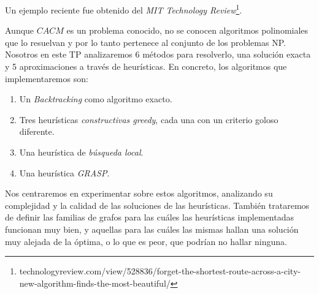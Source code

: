 Un ejemplo reciente fue obtenido del \textit{MIT Technology Review}\footnote{technologyreview.com/view/528836/forget-the-shortest-route-across-a-city-new-algorithm-finds-the-most-beautiful/}. 

Aunque $CACM$ es un problema conocido, no se conocen algoritmos polinomiales que lo resuelvan y por lo tanto pertenece al conjunto de los problemas NP. Nosotros en este TP analizaremos 6 m\'etodos para resolverlo, una soluci\'on exacta y 5 aproximaciones a trav\'es de heur\'isticas. En concreto, los algoritmos que implementaremos son: 

\begin{enumerate}
\item Un \textit{Backtracking} como algoritmo exacto.
\item Tres heur\'isticas \textit{constructivas greedy}, cada una con un criterio goloso diferente. 
\item Una heur\'istica de \textit{b\'usqueda local}.
\item Una heur\'istica \textit{GRASP}.
\end{enumerate}

Nos centraremos en experimentar sobre estos algoritmos, analizando su complejidad y la calidad de las soluciones de las heur\'isticas. Tambi\'en trataremos de definir las familias de grafos para las cu\'ales las heur\'isticas implementadas funcionan muy bien, y aquellas para las cu\'ales las mismas hallan una soluci\'on muy alejada de la \'optima, o lo que es peor, que podr\'ian no hallar ninguna. 
